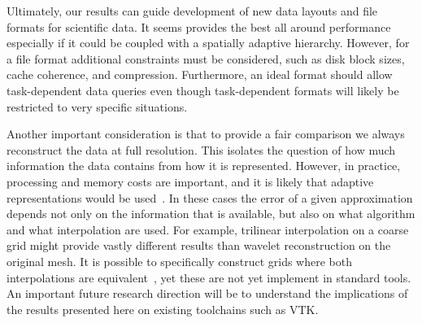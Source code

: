 Ultimately, our results can guide development of new data layouts and file formats for scientific
data. It seems \swav provides the best all around performance especially if it could be coupled with
a spatially adaptive hierarchy. However, for a file format additional constraints must be
considered, such as disk block sizes, cache coherence, and compression. Furthermore, an ideal format
should allow task-dependent data queries even though task-dependent formats will likely be
restricted to very specific situations. 

Another important consideration is that to provide a fair comparison we always reconstruct the data
at full resolution. This isolates the question of how much information the data contains from how it
is represented. However, in practice, processing and memory costs are important, and it is likely
that adaptive representations would be used~\cite{gigavoxels,Gobbetti2008,vdb2013}. In these cases
the error of a given approximation depends not only on the information that is available, but also
on what algorithm and what interpolation are used. For example, trilinear interpolation on a coarse
grid might provide vastly different results than wavelet reconstruction on the original mesh. It is
possible to specifically construct grids where both interpolations are equivalent~\cite{weiss}, yet
these are not yet implement in standard tools. An important future research direction will be to
understand the implications of the results presented here on existing toolchains such as VTK.

